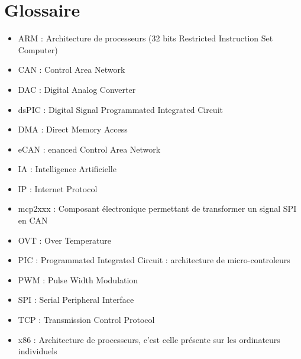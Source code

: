 \documentclass[a4,french,12pt]{article}
\begin{document}
\newpage
\section{Glossaire}
\begin{itemize}
  \item ARM : Architecture de processeurs (32 bits Restricted Instruction Set Computer)
  \item CAN : Control Area Network
  \item DAC : Digital Analog Converter
  \item dsPIC : Digital Signal Programmated Integrated Circuit
  \item DMA : Direct Memory Access
  \item eCAN : enanced Control Area Network
  \item IA : Intelligence Artificielle
  \item IP : Internet Protocol
  \item mcp2xxx : Composant électronique permettant de transformer un signal SPI en CAN
  \item OVT : Over Temperature
  \item PIC : Programmated Integrated Circuit : architecture de micro-controleurs
  \item PWM : Pulse Width Modulation
  \item SPI : Serial Peripheral Interface
  \item TCP : Transmission Control Protocol
  \item x86 : Architecture de processeurs, c'est celle présente sur les ordinateurs individuels 
\end{itemize}
\end{document}

